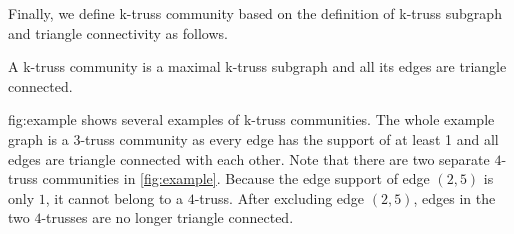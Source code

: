 Finally, we define k-truss community based on the definition of k-truss subgraph and triangle connectivity as follows.

\begin{Def} 
A k-truss community is a maximal k-truss subgraph and all its edges are triangle connected.
\label{def:k-truss_community}
\end{Def}

fig:example shows several examples of k-truss communities. The whole example graph is a $3$-truss community as every edge has the support of at least 1 and all edges are triangle connected with each other. Note that there are two separate $4$-truss communities in \autoref{fig:example}. Because the edge support of edge $(2,5)$ is only $1$, it cannot belong to a $4$-truss. After excluding edge $(2,5)$, edges in the two $4$-trusses are no longer triangle connected.
